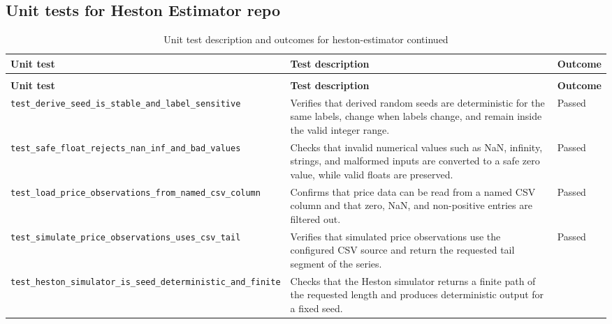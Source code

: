 \documentclass[11pt]{report}
\begin{document}
\subsection{Unit tests for Heston Estimator repo}
{\small
\setlength{\LTpre}{0.5\baselineskip}
\setlength{\LTpost}{0.75\baselineskip}
\begin{longtable}{|L{0.30\textwidth}|L{0.45\textwidth}|L{0.10\textwidth}|}
\caption{Unit test description and outcomes for heston-estimator}
\label{tab:unit-tests}\\
\hline
\textbf{Unit test} & \textbf{Test description} & \textbf{Outcome} \\
\hline
\endfirsthead
\caption[]{Unit test description and outcomes for heston-estimator continued}\\
\hline
\textbf{Unit test} & \textbf{Test description} & \textbf{Outcome} \\
\hline
\endhead
\hline
\endfoot
\texttt{test\_\allowbreak derive\_\allowbreak seed\_\allowbreak is\_\allowbreak stable\_\allowbreak and\_\allowbreak label\_\allowbreak sensitive}
& Verifies that derived random seeds are deterministic for the same labels, change when labels change, and remain inside the valid integer range.
& Passed \\
\hline
\texttt{test\_\allowbreak safe\_\allowbreak float\_\allowbreak rejects\_\allowbreak nan\_\allowbreak inf\_\allowbreak and\_\allowbreak bad\_\allowbreak values}
& Checks that invalid numerical values such as NaN, infinity, strings, and malformed inputs are converted to a safe zero value, while valid floats are preserved.
& Passed \\
\hline
\texttt{test\_\allowbreak load\_\allowbreak price\_\allowbreak observations\_\allowbreak from\_\allowbreak named\_\allowbreak csv\_\allowbreak column}
& Confirms that price data can be read from a named CSV column and that zero, NaN, and non-positive entries are filtered out.
& Passed \\
\hline
\texttt{test\_\allowbreak simulate\_\allowbreak price\_\allowbreak observations\_\allowbreak uses\_\allowbreak csv\_\allowbreak tail}
& Verifies that simulated price observations use the configured CSV source and return the requested tail segment of the series.
& Passed \\
\hline
\texttt{test\_\allowbreak heston\_\allowbreak simulator\_\allowbreak is\_\allowbreak seed\_\allowbreak deterministic\_\allowbreak and\_\allowbreak finite}
& Checks that the Heston simulator returns a finite path of the requested length and produces deterministic output for a fixed seed.

\end{longtable}}
\end{document}
